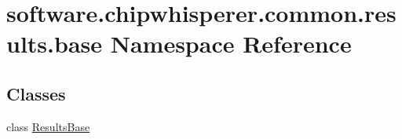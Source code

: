 \hypertarget{namespacesoftware_1_1chipwhisperer_1_1common_1_1results_1_1base}{}\section{software.\+chipwhisperer.\+common.\+results.\+base Namespace Reference}
\label{namespacesoftware_1_1chipwhisperer_1_1common_1_1results_1_1base}
\subsection*{Classes}
\begin{DoxyCompactItemize}
\item 
class \hyperlink{classsoftware_1_1chipwhisperer_1_1common_1_1results_1_1base_1_1ResultsBase}{Results\+Base}
\end{DoxyCompactItemize}
